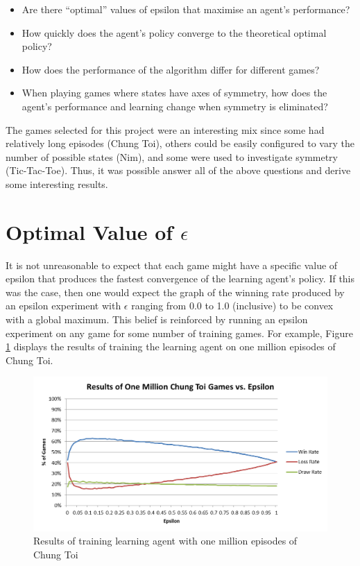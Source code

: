 \documentclass[11pt,a4paper]{report}
\begin{document}
\begin{itemize}
	\item Are there ``optimal'' values of epsilon that maximise an agent's performance?
	\item How quickly does the agent's policy converge to the theoretical optimal policy?
	\item How does the performance of the algorithm differ for different games?
	\item When playing games where states have axes of symmetry, how does the agent's performance and learning change when symmetry is eliminated?
\end{itemize}

The games selected for this project were an interesting mix since some had relatively long episodes (Chung Toi), others could be easily configured to vary the number of possible states (Nim), and some were used to investigate symmetry (Tic-Tac-Toe). Thus, it was possible answer all of the above questions and derive some interesting results.


\section{Optimal Value of $\epsilon$}

It is not unreasonable to expect that each game might have a specific value of epsilon that produces the fastest convergence of the learning agent's policy. If this was the case, then one would expect the graph of the winning rate produced by an epsilon experiment with $\epsilon$ ranging from 0.0 to 1.0 (inclusive) to be convex with a global maximum. This belief is reinforced by running an epsilon experiment on any game for some number of training games. For example, Figure \ref{chung-toi-epsilon-1M-graph} displays the results of training the learning agent on one million episodes of Chung Toi.

\begin{figure}[htbp]
	\begin{center}
		\includegraphics[width=125mm]{ChungToi_EpsilonResults_1MGames.png}
		\caption{Results of training learning agent with one million episodes of Chung Toi}
		\label{chung-toi-epsilon-1M-graph}
	\end{center}
\end{figure}
\end{document}
